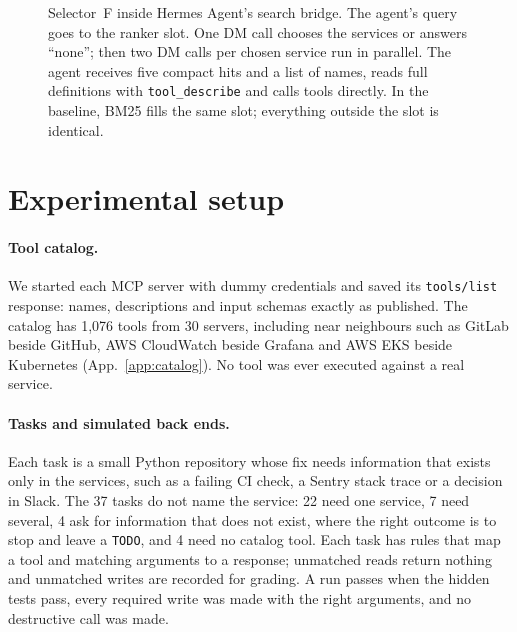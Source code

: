 \documentclass[11pt]{article}
\begin{document}
\begin{figure}[t]
\caption{Selector~F inside Hermes Agent's search bridge. The agent's query goes to the ranker slot. One DM call chooses the
services or answers ``none''; then two DM calls per chosen service run in parallel. The agent receives five compact
hits and a list of names, reads full definitions with \texttt{tool\_describe} and calls tools directly. In the
baseline, BM25 fills the same slot; everything outside the slot is identical.}
\label{fig:flow}
\end{figure}

\section{Experimental setup}\label{sec:setup}
\paragraph{Tool catalog.} We started each MCP server with dummy credentials and saved its \texttt{tools/list}
response: names, descriptions and input schemas exactly as published. The catalog has 1{,}076 tools from 30 servers,
including near neighbours such as GitLab beside GitHub, AWS CloudWatch beside Grafana and AWS EKS beside Kubernetes
(App.~\ref{app:catalog}). No tool was ever executed against a real service.

\paragraph{Tasks and simulated back ends.} Each task is a small Python repository whose fix needs information that
exists only in the services, such as a failing CI check, a Sentry stack trace or a decision in Slack. The 37 tasks do
not name the service: 22 need one service, 7 need several, 4 ask for information that does not exist, where the right
outcome is to stop and leave a \texttt{TODO}, and 4 need no catalog tool. Each task has rules that map a tool and
matching arguments to a response; unmatched reads return nothing and unmatched writes are recorded for grading. A run
passes when the hidden tests pass, every required write was made with the right arguments, and no destructive call was
made.
\end{document}
